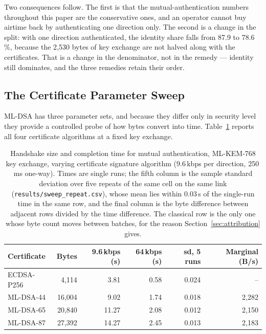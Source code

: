 \documentclass[drones,article,submit,pdftex,moreauthors]{Definitions/mdpi}
\newcommand{\kbps}{kbps}
\newcommand{\mlkem}{ML-KEM}
\newcommand{\mldsa}{ML-DSA}
\begin{document}
Two consequences follow. The first is that the mutual-authentication
numbers throughout this paper are the conservative ones, and an operator
cannot buy airtime back by authenticating one direction only. The second
is a change in the split: with one direction authenticated, the identity
share falls from 87.9 to 78.6\,\%, because the 2{,}530 bytes of key
exchange are not halved along with the certificates. That is a change in
the denominator, not in the remedy --- identity still dominates, and the
three remedies retain their order.

\subsection{The Certificate Parameter Sweep}
\label{sec:sweep}

\mldsa{} has three parameter sets, and because they differ only in
security level they provide a controlled probe of how bytes convert
into time. Table~\ref{tab:sweep} reports all four certificate
algorithms at a fixed key exchange.

\begin{table}[H]
\caption{Handshake size and completion time for mutual authentication,
\mlkem{}-768 key exchange, varying certificate signature algorithm
(9.6\,\kbps{} per direction, 250\,ms one-way). Times are single runs;
the fifth column is the sample standard deviation over five repeats of
the same cell on the same link (\texttt{results/sweep\_repeat.csv}),
whose mean lies within 0.03\,s of the single-run time in the same row,
and the final column is the byte difference between adjacent rows
divided by the time difference. The classical row is the only one whose byte count moves
between batches, for the reason Section~\ref{sec:attribution} gives.}
\label{tab:sweep}
\centering
\small
\begin{tabular}{lrrrrr}
\toprule
Certificate & Bytes & 9.6\,\kbps{} (s) & 64\,\kbps{} (s) & sd, 5 runs & Marginal (B/s) \\
\midrule
ECDSA-P256   & 4{,}114  & 3.81  & 0.58 & 0.024 & -- \\
\mldsa{}-44  & 16{,}004 & 9.02  & 1.74 & 0.018 & 2{,}282 \\
\mldsa{}-65  & 20{,}840 & 11.27 & 2.08 & 0.012 & 2{,}150 \\
\mldsa{}-87  & 27{,}392 & 14.27 & 2.45 & 0.013 & 2{,}183 \\
\bottomrule
\end{tabular}
\end{table}
\end{document}
